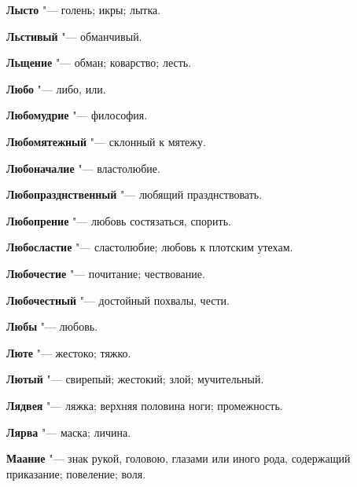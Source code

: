 \begin{mymulticols}{2}
\noindent\textbf{Лысто} "--- голень; икры; лытка. 




\noindent\textbf{Льстивый} "--- обманчивый. 




\noindent\textbf{Льщение} "--- обман; коварство; лесть. 




\noindent\textbf{Любо} "--- либо, или. 




\noindent\textbf{Любомудрие} "--- философия. 




\noindent\textbf{Любомятежный} "--- склонный к мятежу. 




\noindent\textbf{Любоначалие} "--- властолюбие. 




\noindent\textbf{Любопразднственный} "--- любящий празднствовать. 




\noindent\textbf{Любопрение} "--- любовь состязаться, спорить. 




\noindent\textbf{Любосластие} "--- сластолюбие; любовь к плотским утехам. 




\noindent\textbf{Любочестие} "--- почитание; чествование. 




\noindent\textbf{Любочестный} "--- достойный похвалы, чести. 




\noindent\textbf{Любы} "--- любовь. 




\noindent\textbf{Люте} "--- жестоко; тяжко. 




\noindent\textbf{Лютый} "--- свирепый; жестокий; злой; мучительный. 




\noindent\textbf{Лядвея} "--- ляжка; верхняя половина ноги; промежность. 




\noindent\textbf{Лярва} "--- маска; личина. 









\noindent\textbf{Маание} "--- знак рукой, головою, глазами или иного рода, содержащий приказание; повеление; воля. 





\end{mymulticols}

